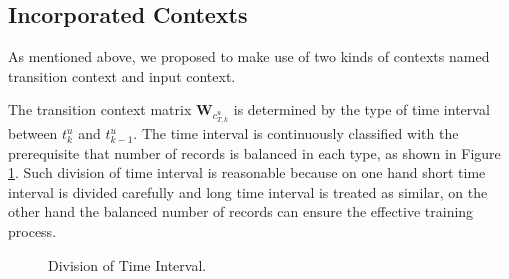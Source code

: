 \documentclass[conference]{IEEEtran}
\begin{document}
\subsection{Incorporated Contexts }
As mentioned above, we proposed to make use of two kinds of contexts named transition context and input context.

The transition context matrix $\textbf{W}_{c_{T,k}^{u}}$ is determined by the type of time interval between $t_k^u$ and $t_{k-1}^u$. The time interval is continuously classified with the prerequisite that number of records is balanced in each type, as shown in Figure \ref{fig:comparision}. Such division of time interval is reasonable because on one hand short time interval is divided carefully and long time interval is treated as similar, on the other hand the balanced number of records can ensure the effective training process.
\begin{figure}[!tb]
\centering
{}
\hspace{-1mm}
\caption{Division of Time Interval.}
\label{fig:comparision}
\end{figure}
\end{document}
